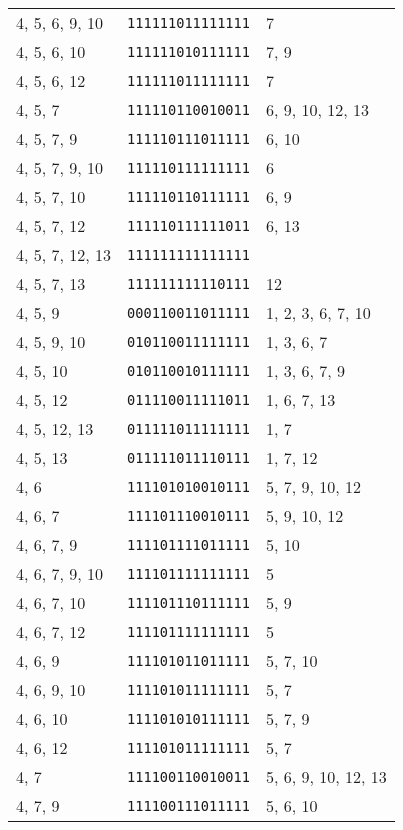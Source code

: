 \documentclass[a4paper,12pt]{article}
\begin{document}
\begin{longtable}{l|l|l}
        4, 5, 6, 9, 10&\texttt{111111011111111}&7\\
        4, 5, 6, 10&\texttt{111111010111111}&7, 9\\
        4, 5, 6, 12&\texttt{111111011111111}&7\\
        4, 5, 7&\texttt{111110110010011}&6, 9, 10, 12, 13\\
        4, 5, 7, 9&\texttt{111110111011111}&6, 10\\
        4, 5, 7, 9, 10&\texttt{111110111111111}&6\\
        4, 5, 7, 10&\texttt{111110110111111}&6, 9\\
        4, 5, 7, 12&\texttt{111110111111011}&6, 13\\
        4, 5, 7, 12, 13&\texttt{111111111111111}&\\
        4, 5, 7, 13&\texttt{111111111110111}&12\\
        4, 5, 9&\texttt{000110011011111}&1, 2, 3, 6, 7, 10\\
        4, 5, 9, 10&\texttt{010110011111111}&1, 3, 6, 7\\
        4, 5, 10&\texttt{010110010111111}&1, 3, 6, 7, 9\\
        4, 5, 12&\texttt{011110011111011}&1, 6, 7, 13\\
        4, 5, 12, 13&\texttt{011111011111111}&1, 7\\
        4, 5, 13&\texttt{011111011110111}&1, 7, 12\\
        4, 6&\texttt{111101010010111}&5, 7, 9, 10, 12\\
        4, 6, 7&\texttt{111101110010111}&5, 9, 10, 12\\
        4, 6, 7, 9&\texttt{111101111011111}&5, 10\\
        4, 6, 7, 9, 10&\texttt{111101111111111}&5\\
        4, 6, 7, 10&\texttt{111101110111111}&5, 9\\
        4, 6, 7, 12&\texttt{111101111111111}&5\\
        4, 6, 9&\texttt{111101011011111}&5, 7, 10\\
        4, 6, 9, 10&\texttt{111101011111111}&5, 7\\
        4, 6, 10&\texttt{111101010111111}&5, 7, 9\\
        4, 6, 12&\texttt{111101011111111}&5, 7\\
        4, 7&\texttt{111100110010011}&5, 6, 9, 10, 12, 13\\
        4, 7, 9&\texttt{111100111011111}&5, 6, 10\\

\end{longtable}
\end{document}
